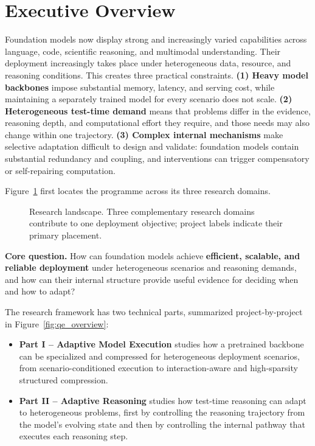 \documentclass[12pt,a4paper]{article}
\begin{document}

\section*{Executive Overview}
\begingroup\small

Foundation models now display strong and increasingly varied capabilities across language, code, scientific reasoning, and multimodal understanding. Their deployment increasingly takes place under heterogeneous data, resource, and reasoning conditions. This creates three practical constraints. \textbf{(1) Heavy model backbones} impose substantial memory, latency, and serving cost, while maintaining a separately trained model for every scenario does not scale. \textbf{(2) Heterogeneous test-time demand} means that problems differ in the evidence, reasoning depth, and computational effort they require, and those needs may also change within one trajectory. \textbf{(3) Complex internal mechanisms} make selective adaptation difficult to design and validate: foundation models contain substantial redundancy and coupling, and interventions can trigger compensatory or self-repairing computation.

Figure~\ref{fig:research-topics} first locates the programme across its three research domains.
\begin{figure}[H]
\centering
\resizebox{0.94\textwidth}{!}{}
\caption{Research landscape. Three complementary research domains contribute to one deployment objective; project labels indicate their primary placement.}
\label{fig:research-topics}
\end{figure}

\begin{thesisbox}
\textbf{Core question.} How can foundation models achieve \textbf{efficient, scalable, and reliable deployment} under heterogeneous scenarios and reasoning demands, and how can their internal structure provide useful evidence for deciding when and how to adapt?
\end{thesisbox}

The research framework has two technical parts, summarized project-by-project in Figure~\ref{fig:qe_overview}:
\begin{itemize}[leftmargin=1.30em,itemsep=0.08em,topsep=0.04em]
  \item \textbf{Part I -- Adaptive Model Execution} studies how a pretrained backbone can be specialized and compressed for heterogeneous deployment scenarios, from scenario-conditioned execution to interaction-aware and high-sparsity structured compression.
  \item \textbf{Part II -- Adaptive Reasoning} studies how test-time reasoning can adapt to heterogeneous problems, first by controlling the reasoning trajectory from the model's evolving state and then by controlling the internal pathway that executes each reasoning step.
\end{itemize}
\end{document}

